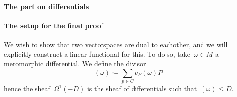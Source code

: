 \documentclass[10pt,a4paper]{article}
\theoremstyle{lecture}
\begin{document}
\paragraph{The part on differentials}

\paragraph{The setup for the final proof}
We wish to show that two vectorspaces are dual to eachother, and we will explicitly construct a linear functional for this. To do so, take~$\omega\in M$ a meromorphic differential. We define the divisor
\begin{equation}
  (\omega)\coloneqq\sum_{p\in C}v_P(\omega)P
\end{equation}
hence the sheaf~$\Omega^1(-D)$ is the sheaf of differentials such that~$(\omega)\leq D$.
\end{document}

